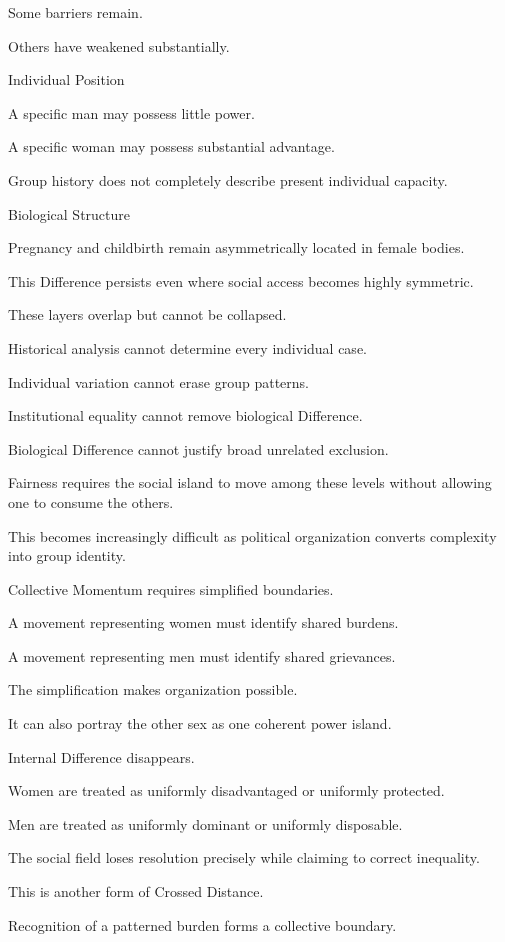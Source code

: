 Some barriers remain.

Others have weakened substantially.

Individual Position

A specific man may possess little power.

A specific woman may possess substantial advantage.

Group history does not completely describe present individual capacity.

Biological Structure

Pregnancy and childbirth remain asymmetrically located in female bodies.

This Difference persists even where social access becomes highly symmetric.

These layers overlap but cannot be collapsed.

Historical analysis cannot determine every individual case.

Individual variation cannot erase group patterns.

Institutional equality cannot remove biological Difference.

Biological Difference cannot justify broad unrelated exclusion.

Fairness requires the social island to move among these levels without allowing one to consume the others.

This becomes increasingly difficult as political organization converts complexity into group identity.

Collective Momentum requires simplified boundaries.

A movement representing women must identify shared burdens.

A movement representing men must identify shared grievances.

The simplification makes organization possible.

It can also portray the other sex as one coherent power island.

Internal Difference disappears.

Women are treated as uniformly disadvantaged or uniformly protected.

Men are treated as uniformly dominant or uniformly disposable.

The social field loses resolution precisely while claiming to correct inequality.

This is another form of Crossed Distance.

Recognition of a patterned burden forms a collective boundary.

